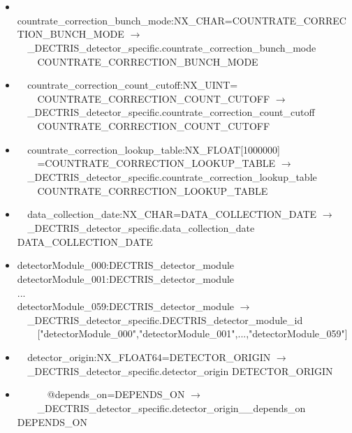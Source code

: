 \documentclass[11pt]{article}
\begin{document}
{{\begin{itemize}
\item{\verb|  |countrate\_correction\_bunch\_mode:NX\_CHAR=COUNTRATE\_CORRECTION\_BUNCH\_MODE $\rightarrow$\\
\verb|  |\_DECTRIS\_detector\_specific.countrate\_correction\_bunch\_mode \\
\verb|    |COUNTRATE\_CORRECTION\_BUNCH\_MODE}

\item{\verb|  |countrate\_correction\_count\_cutoff:NX\_UINT=\\
\verb|    |COUNTRATE\_CORRECTION\_COUNT\_CUTOFF $\rightarrow$\\
\verb|  |\_DECTRIS\_detector\_specific.countrate\_correction\_count\_cutoff \\
\verb|    |COUNTRATE\_CORRECTION\_COUNT\_CUTOFF}

\item{\verb|  |countrate\_correction\_lookup\_table:NX\_FLOAT[1000000]\\
\verb|    |=COUNTRATE\_CORRECTION\_LOOKUP\_TABLE $\rightarrow$\\
\verb|  |\_DECTRIS\_detector\_specific.countrate\_correction\_lookup\_table \\
\verb|    |COUNTRATE\_CORRECTION\_LOOKUP\_TABLE}

\item{\verb|  |data\_collection\_date:NX\_CHAR=DATA\_COLLECTION\_DATE $\rightarrow$\\
\verb|  |\_DECTRIS\_detector\_specific.data\_collection\_date DATA\_COLLECTION\_DATE}

\item{detectorModule\_000:DECTRIS\_detector\_module \\
detectorModule\_001:DECTRIS\_detector\_module\\
... \\
detectorModule\_059:DECTRIS\_detector\_module $\rightarrow$\\
\verb|  |\_DECTRIS\_detector\_specific.DECTRIS\_detector\_module\_id\\
\verb|    |["detectorModule\_000","detectorModule\_001",...,"detectorModule\_059"]}

\item{\verb|  |detector\_origin:NX\_FLOAT64=DETECTOR\_ORIGIN $\rightarrow$\\
\verb|  |\_DECTRIS\_detector\_specific.detector\_origin DETECTOR\_ORIGIN}

\item{\verb|      |@depends\_on=DEPENDS\_ON $\rightarrow$\\
\verb|    |\_DECTRIS\_detector\_specific.detector\_origin\_\_depends\_on DEPENDS\_ON}


\end{itemize}}}
\end{document}
